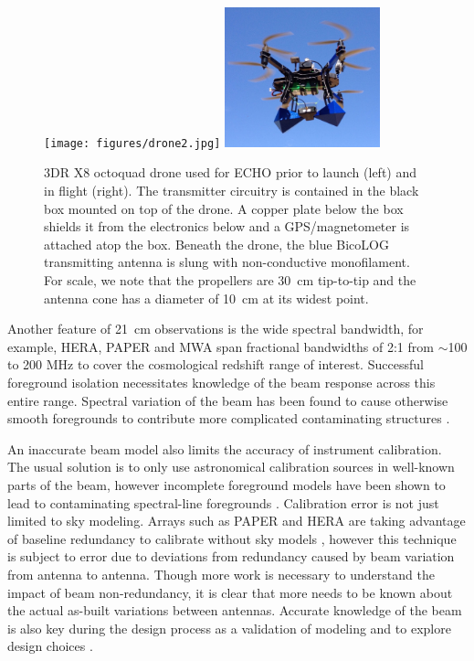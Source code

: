 \documentclass[preprint2,numberedappendix,tighten,twocolappendix]{aastex6}
\begin{document}
\begin{figure}[hbt]
\centering
\texttt{[image: figures/drone2.jpg]}
\includegraphics[width=0.4\textwidth]{figures/drone.png}
\caption{3DR X8 octoquad drone used for ECHO prior to launch (left) and in flight (right).  The transmitter circuitry is contained in the black box mounted on top of the drone.  A copper plate below the box shields it from the electronics below and a GPS/magnetometer is attached atop the box. Beneath the drone, the blue BicoLOG transmitting antenna is slung with non-conductive monofilament. For scale, we note that the propellers are 30~cm tip-to-tip and the antenna cone has a diameter of 10~cm at its widest point.}
\label{fig:drone}
\end{figure}

Another feature of 21~cm observations is the wide spectral bandwidth, for example, HERA, PAPER and MWA span fractional bandwidths of 2:1 from $\sim$100 to 200 MHz to cover the cosmological redshift range of interest. Successful foreground isolation necessitates knowledge of the beam response across this entire range.  Spectral variation of the beam has been found to cause otherwise smooth foregrounds to contribute more complicated contaminating structures \citep{2016:ThyagarajanBeamChromaticity,2016:EwallWiceHERAdisharXiv}. 

An inaccurate beam model also limits the accuracy of instrument calibration. The usual solution is to only use astronomical calibration sources in well-known parts of the beam, however incomplete foreground models have been shown to lead to contaminating spectral-line foregrounds \citep{2016:BarryCalibrationRequirements}.  Calibration error is not just limited to sky modeling.  Arrays such as PAPER and HERA are taking advantage of baseline redundancy to calibrate without sky models \citep{Liu:2010p10391,2014ZhengMITEoR,2015ApJ...809...61A}, however this technique is subject to error due to deviations from redundancy caused by beam variation from antenna to antenna. Though more work is necessary to understand the impact of beam non-redundancy, it is clear that more needs to be known about the actual as-built variations between antennas.  Accurate knowledge of the beam is also key during the design process as a validation of modeling and to explore design choices \citep{2014IAWPL..13..169V,2016:NebenHERAdish}. 
\end{document}
